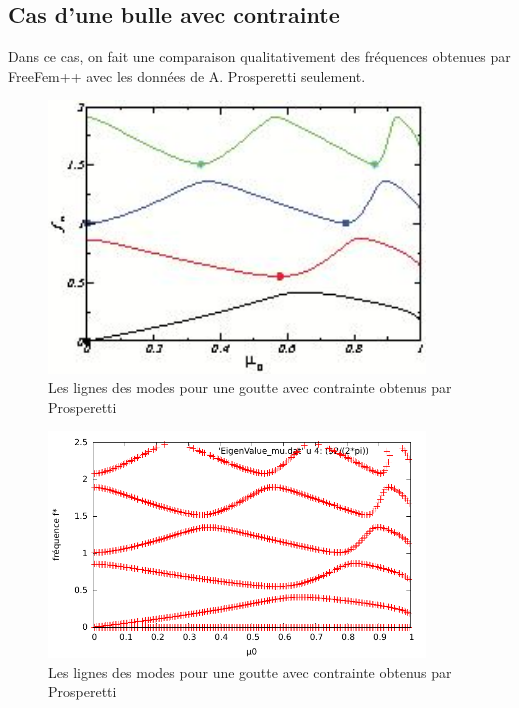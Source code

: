 \documentclass[a4paper]{report}
\begin{document}
\subsection{Cas d'une bulle avec contrainte}
Dans ce cas, on fait une comparaison qualitativement des fréquences obtenues par FreeFem++ avec les données de A. Prosperetti seulement.
\begin{figure}[!htbp]
\centering
\includegraphics[width=10cm]{2_3_4_contrainte_Prosperetti.jpeg}
\caption{Les lignes des modes pour une goutte avec contrainte obtenus par Prosperetti}
\end{figure}
\begin{figure}[!htbp]
\centering
\includegraphics[width=10cm]{2_3_4_contrainte_FreeFem}
\caption{Les lignes des modes pour une goutte avec contrainte obtenus par Prosperetti}
\end{figure}



\end{document}
